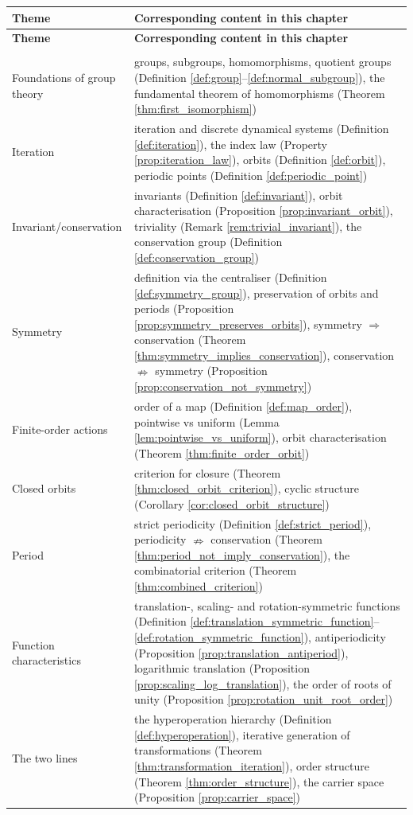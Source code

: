 \begingroup
\renewcommand{\arraystretch}{1.3}
\begin{longtable}{@{}>{\raggedright\arraybackslash}p{3cm}
    >{\raggedright\arraybackslash}p{\dimexpr\linewidth-3cm-2\tabcolsep\relax}@{}}
\toprule
\textbf{Theme} & \textbf{Corresponding content in this chapter} \\
\midrule
\endfirsthead
\toprule
\textbf{Theme} & \textbf{Corresponding content in this chapter} \\
\midrule
\endhead
\midrule
\multicolumn{2}{r@{}}{\textit{Continued on the next page}} \\
\endfoot
\bottomrule
\endlastfoot
Foundations of group theory & groups, subgroups, homomorphisms, quotient groups (Definition \ref{def:group}--\ref{def:normal_subgroup}), the fundamental theorem of homomorphisms (Theorem \ref{thm:first_isomorphism}) \\
Iteration & iteration and discrete dynamical systems (Definition \ref{def:iteration}), the index law (Property \ref{prop:iteration_law}), orbits (Definition \ref{def:orbit}), periodic points (Definition \ref{def:periodic_point}) \\
Invariant/\allowbreak conservation & invariants (Definition \ref{def:invariant}), orbit characterisation (Proposition \ref{prop:invariant_orbit}), triviality (Remark \ref{rem:trivial_invariant}), the conservation group (Definition \ref{def:conservation_group}) \\
Symmetry & definition via the centraliser (Definition \ref{def:symmetry_group}), preservation of orbits and periods (Proposition \ref{prop:symmetry_preserves_orbits}), symmetry $\Rightarrow$ conservation (Theorem \ref{thm:symmetry_implies_conservation}), conservation $\nRightarrow$ symmetry (Proposition \ref{prop:conservation_not_symmetry}) \\
Finite-order actions & order of a map (Definition \ref{def:map_order}), pointwise vs uniform (Lemma \ref{lem:pointwise_vs_uniform}), orbit characterisation (Theorem \ref{thm:finite_order_orbit}) \\
Closed orbits & criterion for closure (Theorem \ref{thm:closed_orbit_criterion}), cyclic structure (Corollary \ref{cor:closed_orbit_structure}) \\
Period & strict periodicity (Definition \ref{def:strict_period}), periodicity $\nRightarrow$ conservation (Theorem \ref{thm:period_not_imply_conservation}), the combinatorial criterion (Theorem \ref{thm:combined_criterion}) \\
Function characteristics & translation-, scaling- and rotation-symmetric functions (Definition \ref{def:translation_symmetric_function}--\ref{def:rotation_symmetric_function}), antiperiodicity (Proposition \ref{prop:translation_antiperiod}), logarithmic translation (Proposition \ref{prop:scaling_log_translation}), the order of roots of unity (Proposition \ref{prop:rotation_unit_root_order}) \\
The two lines & the hyperoperation hierarchy (Definition \ref{def:hyperoperation}), iterative generation of transformations (Theorem \ref{thm:transformation_iteration}), order structure (Theorem \ref{thm:order_structure}), the carrier space (Proposition \ref{prop:carrier_space}) \\
\end{longtable}
